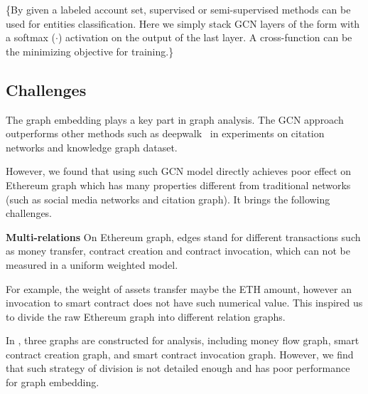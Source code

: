 \{By given a labeled account set, supervised or semi-supervised methods can be used for entities classification. Here we simply stack GCN layers of the form with a softmax ($\cdot$) activation on the output of the last layer. A cross-function can be the minimizing objective for training.\}

\subsection{Challenges}
\label{section:time}
The graph embedding plays a key part in graph analysis. The GCN approach \cite{kipf2016semi} outperforms other methods such as deepwalk~\cite{perozzi2014deepwalk} in experiments on citation networks and knowledge graph dataset.

However, we found that using such GCN model directly achieves poor effect on Ethereum graph which has many properties different from traditional networks (such as social media networks and citation graph). It brings the following challenges.


\textbf{Multi-relations} On Ethereum graph, edges stand for different transactions such as money transfer, contract creation and contract invocation, which can not be measured in a uniform weighted model.

For example, the weight of assets transfer maybe the ETH amount, however an invocation to smart contract does not have such numerical value. This inspired us to divide the raw Ethereum graph into different relation graphs.

In \cite{chen2018infocom}, three graphs are constructed for analysis, including money flow graph, smart contract creation graph, and smart contract invocation graph. However, we find that such strategy of division is not detailed enough and has poor performance for graph embedding.





